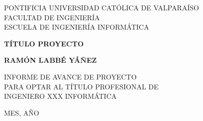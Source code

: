 \begin{center}
PONTIFICIA UNIVERSIDAD CATÓLICA DE VALPARAÍSO\\
FACULTAD DE INGENIERÍA\\
ESCUELA DE INGENIERÍA INFORMÁTICA\\

\vspace{5cm}

\Large{\textbf{TÍTULO PROYECTO}}

\vspace{3cm}
\normalsize{\textbf{RAMÓN LABBÉ YÁÑEZ}}\\
\end{center}

\begin{flushright}
\vspace{3cm}
INFORME DE AVANCE DE PROYECTO\\
PARA OPTAR AL TÍTULO PROFESIONAL DE\\ 
INGENIERO XXX INFORMÁTICA\\ 
\end{flushright}

\vspace{1cm}
\begin{center} 
MES, AÑO\\
\end{center}